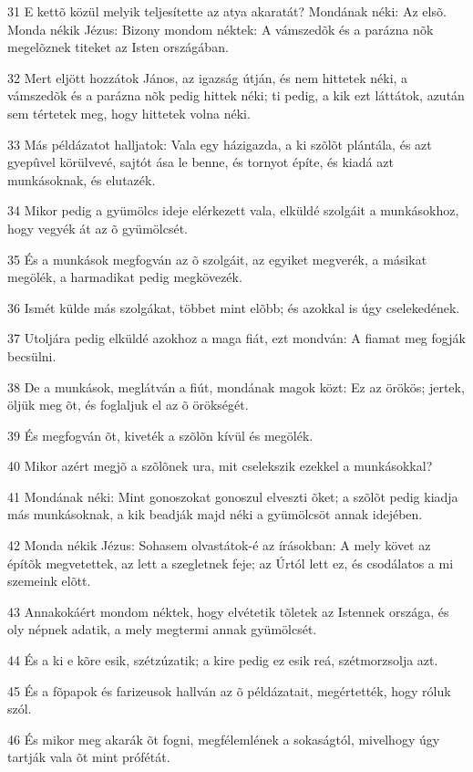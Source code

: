 \par 31 E kettõ közül melyik teljesítette az atya akaratát? Mondának néki: Az elsõ. Monda nékik Jézus: Bizony mondom néktek: A vámszedõk és a parázna nõk megelõznek titeket az Isten országában.
\par 32 Mert eljött hozzátok János, az igazság útján, és nem hittetek néki, a vámszedõk és a parázna nõk pedig hittek néki; ti pedig, a kik ezt láttátok, azután sem tértetek meg, hogy hittetek volna néki.
\par 33 Más példázatot halljatok: Vala egy házigazda, a ki szõlõt plántála, és azt gyepûvel körülvevé, sajtót ása le benne, és tornyot építe, és kiadá azt munkásoknak, és  elutazék.
\par 34 Mikor pedig a gyümölcs ideje elérkezett vala, elküldé szolgáit a munkásokhoz, hogy vegyék át az õ gyümölcsét.
\par 35 És a munkások megfogván az õ szolgáit, az egyiket megverék, a másikat megölék, a harmadikat pedig megkövezék.
\par 36 Ismét külde más szolgákat, többet mint elõbb; és azokkal is úgy cselekedének.
\par 37 Utoljára pedig elküldé azokhoz a maga fiát, ezt mondván: A fiamat meg fogják becsülni.
\par 38 De a munkások, meglátván a fiút, mondának magok közt: Ez az örökös; jertek, öljük meg õt, és foglaljuk el az õ örökségét.
\par 39 És megfogván õt, kiveték a szõlõn kívül és megölék.
\par 40 Mikor azért megjõ a szõlõnek ura, mit cselekszik ezekkel a munkásokkal?
\par 41 Mondának néki: Mint gonoszokat gonoszul elveszti õket; a szõlõt pedig kiadja más munkásoknak, a kik beadják majd néki a gyümölcsöt annak idejében.
\par 42 Monda nékik Jézus: Sohasem olvastátok-é az írásokban: A mely követ az építõk megvetettek, az lett a szegletnek feje; az Úrtól lett ez, és csodálatos a mi szemeink elõtt.
\par 43 Annakokáért mondom néktek, hogy elvétetik tõletek az Istennek országa, és oly népnek adatik, a mely megtermi annak gyümölcsét.
\par 44 És a ki e kõre esik, szétzúzatik; a kire pedig ez esik reá, szétmorzsolja azt.
\par 45 És a fõpapok és farizeusok hallván az õ példázatait, megértették, hogy róluk szól.
\par 46 És mikor meg akarák õt fogni, megfélemlének a sokaságtól, mivelhogy úgy tartják vala õt mint prófétát.

